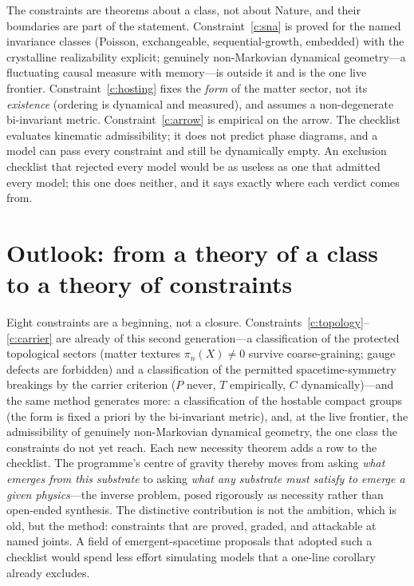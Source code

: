 \documentclass[aps,prd,reprint,nofootinbib,superscriptaddress,floatfix]{revtex4-2}
\begin{document}
The constraints are theorems about a class, not about Nature, and their boundaries are part of
the statement. Constraint~\ref{c:sna} is proved for the named invariance classes
(Poisson, exchangeable, sequential-growth, embedded) with the crystalline realizability explicit;
genuinely non-Markovian dynamical geometry---a fluctuating causal measure with memory---is outside
it and is the one live frontier. Constraint~\ref{c:hosting} fixes the \emph{form} of the matter
sector, not its \emph{existence} (ordering is dynamical and measured), and assumes a non-degenerate
bi-invariant metric. Constraint~\ref{c:arrow} is empirical on the arrow. The checklist evaluates
kinematic admissibility; it does not predict phase diagrams, and a model can pass every constraint
and still be dynamically empty. An exclusion checklist that rejected every model would be as
useless as one that admitted every model; this one does neither, and it says exactly where each
verdict comes from.

\section{Outlook: from a theory of a class to a theory of constraints}
\label{sec:outlook}

Eight constraints are a beginning, not a closure. Constraints~\ref{c:topology}--\ref{c:carrier}
are already of this second generation---a classification of the protected topological sectors
(matter textures $\pi_n(X)\neq0$ survive coarse-graining; gauge defects are forbidden) and a
classification of the permitted spacetime-symmetry breakings by the carrier criterion ($P$
never, $T$ empirically, $C$ dynamically)---and the same method generates more: a classification
of the hostable compact groups (the form is fixed a priori by the bi-invariant metric), and, at
the live frontier, the admissibility of genuinely non-Markovian dynamical geometry, the one class
the constraints do not yet reach. Each new necessity theorem adds a row to the checklist.
The programme's centre of gravity thereby moves from asking \emph{what emerges from this substrate}
to asking \emph{what any substrate must satisfy to emerge a given physics}---the inverse problem,
posed rigorously as necessity rather than open-ended synthesis. The distinctive contribution is not
the ambition, which is old, but the method: constraints that are proved, graded, and attackable at
named joints. A field of emergent-spacetime proposals that adopted such a checklist would spend less
effort simulating models that a one-line corollary already excludes.
\end{document}
